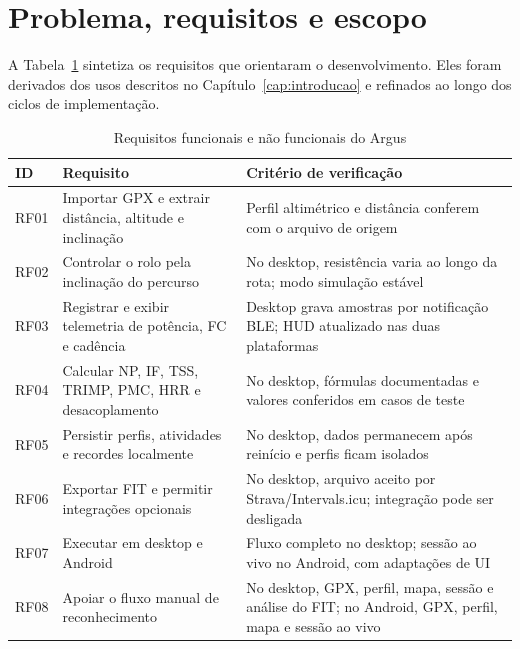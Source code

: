 \section{Problema, requisitos e escopo}
\label{sec:problema-requisitos}

A Tabela~\ref{tab:requisitos} sintetiza os requisitos que orientaram o
desenvolvimento. Eles foram derivados dos usos descritos no
Capítulo~\ref{cap:introducao} e refinados ao longo dos ciclos de implementação.

\begin{table}[htbp]
    \centering
    \caption{Requisitos funcionais e não funcionais do Argus}
    \label{tab:requisitos}
    \small
    \begin{tabular}{
        >{\raggedright\arraybackslash}p{1.4cm}
        >{\raggedright\arraybackslash}p{7.4cm}
        >{\raggedright\arraybackslash}p{5.4cm}
    }
        \toprule
        \textbf{ID} & \textbf{Requisito} & \textbf{Critério de verificação} \\
        \midrule
        RF01 & Importar GPX e extrair distância, altitude e inclinação &
        Perfil altimétrico e distância conferem com o arquivo de origem \\
        RF02 & Controlar o rolo pela inclinação do percurso &
        No desktop, resistência varia ao longo da rota; modo simulação estável \\
        RF03 & Registrar e exibir telemetria de potência, FC e cadência &
        Desktop grava amostras por notificação BLE; HUD atualizado nas duas
        plataformas \\
        RF04 & Calcular NP, IF, TSS, TRIMP, PMC, HRR e desacoplamento &
        No desktop, fórmulas documentadas e valores conferidos em casos de
        teste \\
        RF05 & Persistir perfis, atividades e recordes localmente &
        No desktop, dados permanecem após reinício e perfis ficam isolados \\
        RF06 & Exportar FIT e permitir integrações opcionais &
        No desktop, arquivo aceito por Strava/Intervals.icu; integração pode ser
        desligada \\
        RF07 & Executar em desktop e Android &
        Fluxo completo no desktop; sessão ao vivo no Android, com adaptações de
        UI \\
        RF08 & Apoiar o fluxo manual de reconhecimento &
        No desktop, GPX, perfil, mapa, sessão e análise do FIT; no Android,
        GPX, perfil, mapa e sessão ao vivo \\

\end{tabular}
\end{table}
